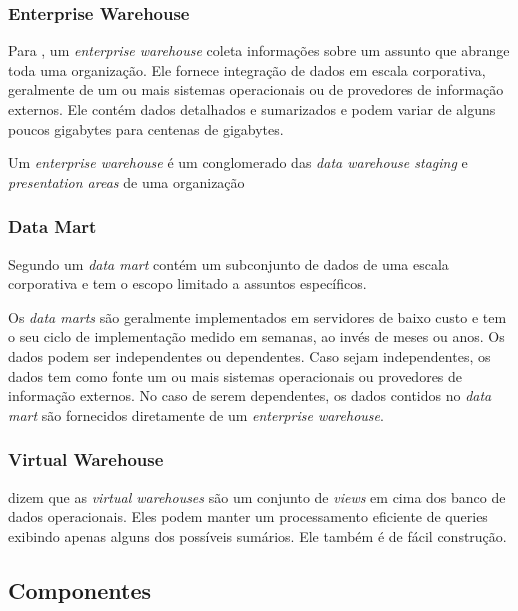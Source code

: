\subsubsection{Enterprise Warehouse}
Para , um \textit{enterprise warehouse} coleta informações sobre um assunto que abrange toda uma organização. Ele fornece integração de dados em escala corporativa, geralmente de um ou mais sistemas operacionais ou de provedores de informação externos. Ele contém dados detalhados e sumarizados e podem variar de alguns poucos gigabytes para centenas de gigabytes.

Um \textit{enterprise warehouse} é um conglomerado das \textit{data warehouse staging} e \textit{presentation areas} de uma organização \citep{kimball2002}


\subsubsection{Data Mart}
Segundo   um \textit{data mart} contém um subconjunto de dados de uma escala corporativa e tem o escopo limitado a assuntos específicos.

Os \textit{data marts} são geralmente implementados em servidores de baixo custo e tem o seu ciclo de implementação medido em semanas, ao invés de meses ou anos. Os dados podem ser independentes ou dependentes. Caso sejam independentes, os dados tem como fonte um ou mais sistemas operacionais ou provedores de informação externos. No caso de serem dependentes, os dados contidos no \textit{data mart} são fornecidos diretamente de um \textit{enterprise warehouse}.

\subsubsection{Virtual Warehouse}
 dizem que as \textit{virtual warehouses} são um conjunto de \textit{views} em cima dos banco de dados operacionais. Eles podem manter um processamento eficiente de queries exibindo apenas alguns dos possíveis sumários. Ele também é de fácil construção.

\subsection{Componentes}

